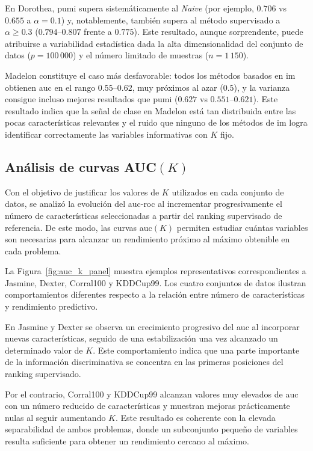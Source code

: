 En Dorothea, \acrshort{pumi} supera sistemáticamente al \textit{Naive} (por ejemplo, $0.706$ vs $0.655$ a $\alpha=0.1$) y, notablemente, también supera al método supervisado a $\alpha \geq 0.3$ ($0.794$--$0.807$ frente a $0.775$). Este resultado, aunque sorprendente, puede atribuirse a variabilidad estadística dada la alta dimensionalidad del conjunto de datos ($p=100\,000$) y el número limitado de muestras ($n=1\,150$).

Madelon constituye el caso más desfavorable: todos los métodos basados en \acrshort{im} obtienen \acrshort{auc} en el rango $0.55$--$0.62$, muy próximos al azar ($0.5$), y la varianza consigue incluso mejores resultados que \acrshort{pumi} ($0.627$ vs $0.551$--$0.621$). Este resultado indica que la señal de clase en Madelon está tan distribuida entre las pocas características relevantes y el ruido que ninguno de los métodos de \acrshort{im} logra identificar correctamente las variables informativas con $K$ fijo.


\subsection{Análisis de curvas AUC$(K)$}
\label{subsec:auc_k}

Con el objetivo de justificar los valores de $K$ utilizados en cada conjunto de datos, se analizó la evolución del \acrshort{auc}-\acrshort{roc} al incrementar progresivamente el número de características seleccionadas a partir del ranking supervisado de referencia. De este modo, las curvas \acrshort{auc}$(K)$ permiten estudiar cuántas variables son necesarias para alcanzar un rendimiento próximo al máximo obtenible en cada problema.

La Figura~\ref{fig:auc_k_panel} muestra ejemplos representativos correspondientes a Jasmine, Dexter, Corral100 y KDDCup99. Los cuatro conjuntos de datos ilustran comportamientos diferentes respecto a la relación entre número de características y rendimiento predictivo.

En Jasmine y Dexter se observa un crecimiento progresivo del \acrshort{auc} al incorporar nuevas características, seguido de una estabilización una vez alcanzado un determinado valor de $K$. Este comportamiento indica que una parte importante de la información discriminativa se concentra en las primeras posiciones del ranking supervisado.

Por el contrario, Corral100 y KDDCup99 alcanzan valores muy elevados de \acrshort{auc} con un número reducido de características y muestran mejoras prácticamente nulas al seguir aumentando $K$. Este resultado es coherente con la elevada separabilidad de ambos problemas, donde un subconjunto pequeño de variables resulta suficiente para obtener un rendimiento cercano al máximo.

